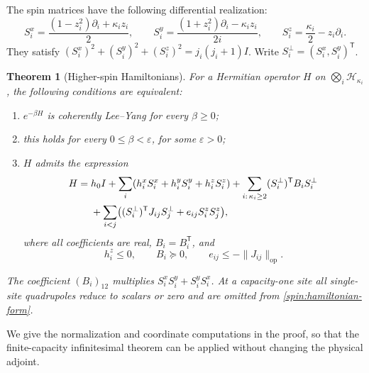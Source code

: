 \documentclass[reqno]{amsart}
\newtheorem{theorem}{Theorem}[section]
\theoremstyle{definition}
\theoremstyle{remark}
\begin{document}
The spin matrices have the following differential realization:
\begin{equation}\label{spin:differential}
 S_i^x=\frac{(1-z_i^2)\partial_i+\kappa_i z_i}{2},\qquad
 S_i^y=\frac{(1+z_i^2)\partial_i-\kappa_i z_i}{2i},\qquad
 S_i^z=\frac{\kappa_i}{2}-z_i\partial_i.
\end{equation}
They satisfy
$(S_i^x)^2+(S_i^y)^2+(S_i^z)^2=j_i(j_i+1)I$.
Write $S_i^\perp=(S_i^x,S_i^y)^{\mathsf T}$.

\begin{theorem}[Higher-spin Hamiltonians]\label{spin:hamiltonian}
For a Hermitian operator $H$ on $\bigotimes_i\mathcal H_{\kappa_i}$, the
following conditions are equivalent:
\begin{enumerate}
\item $e^{-\beta H}$ is coherently Lee--Yang for every $\beta\geq0$;
\item this holds for every $0\leq\beta<\varepsilon$, for some
      $\varepsilon>0$;
\item $H$ admits the expression
\begin{align}\label{spin:hamiltonian-form}
 H={}&h_0 I+\sum_i(h_i^xS_i^x+h_i^yS_i^y+h_i^zS_i^z)
       +\sum_{i:\,\kappa_i\geq2}(S_i^\perp)^{\mathsf T}B_iS_i^\perp
       \notag\\
    &+\sum_{i<j}\bigl((S_i^\perp)^{\mathsf T}J_{ij}S_j^\perp
                         +e_{ij}S_i^zS_j^z\bigr),
\end{align}
where all coefficients are real, $B_i=B_i^{\mathsf T}$, and
\begin{equation}\label{spin:hamiltonian-cone}
 h_i^z\leq0,\qquad B_i\succeq0,\qquad
 e_{ij}\leq-\|J_{ij}\|_{\mathrm{op}}.
\end{equation}
\end{enumerate}
The coefficient $(B_i)_{12}$ multiplies
$S_i^xS_i^y+S_i^yS_i^x$.  At a capacity-one site all single-site
quadrupoles reduce to scalars or zero and are omitted from
\eqref{spin:hamiltonian-form}.
\end{theorem}

We give the normalization and coordinate computations in the proof, so that
the finite-capacity infinitesimal theorem can be applied without changing
the physical adjoint.
\end{document}
